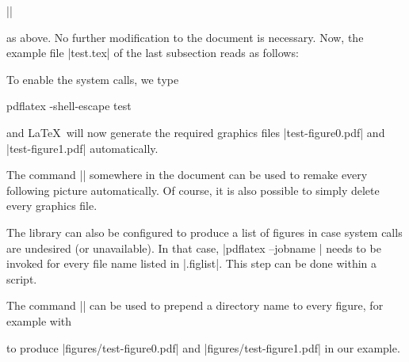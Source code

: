 \begin{pgfgraphicnamed}
|\tikzexternalize|

\noindent as above. No further modification to the document is necessary. Now, the example file |test.tex| of the last subsection reads as follows:
\noindent To enable the system calls, we type
\begin{codeexample}
pdflatex -shell-escape test
\end{codeexample}
\noindent and \LaTeX\ will now generate the required graphics files |test-figure0.pdf| and |test-figure1.pdf| automatically.

The command |\tikzset{external/force remake}| somewhere in the document can be used to remake every following picture automatically. Of course, it is also possible to simply delete every graphics file.

The library can also be configured to produce a list of figures in case system calls are undesired (or unavailable). In that case, |pdflatex --jobname | needs to be invoked for every file name listed in |.figlist|. This step can be done within a script.

The command || can be used to prepend a directory name to every figure, for example with
\begin{codeexample}
\end{codeexample}
\noindent to produce |figures/test-figure0.pdf| and |figures/test-figure1.pdf| in our example.


\end{pgfgraphicnamed}
